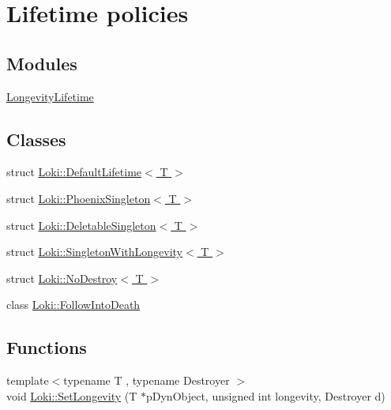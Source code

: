 \hypertarget{group__LifetimeGroup}{}\section{Lifetime policies}
\label{group__LifetimeGroup}
\subsection*{Modules}
\begin{DoxyCompactItemize}
\item 
\hyperlink{group__LongevityLifetimeGroup}{Longevity\+Lifetime}
\end{DoxyCompactItemize}
\subsection*{Classes}
\begin{DoxyCompactItemize}
\item 
struct \hyperlink{structLoki_1_1DefaultLifetime}{Loki\+::\+Default\+Lifetime$<$ T $>$}
\item 
struct \hyperlink{classLoki_1_1PhoenixSingleton}{Loki\+::\+Phoenix\+Singleton$<$ T $>$}
\item 
struct \hyperlink{classLoki_1_1DeletableSingleton}{Loki\+::\+Deletable\+Singleton$<$ T $>$}
\item 
struct \hyperlink{classLoki_1_1SingletonWithLongevity}{Loki\+::\+Singleton\+With\+Longevity$<$ T $>$}
\item 
struct \hyperlink{structLoki_1_1NoDestroy}{Loki\+::\+No\+Destroy$<$ T $>$}
\item 
class \hyperlink{classLoki_1_1FollowIntoDeath}{Loki\+::\+Follow\+Into\+Death}
\end{DoxyCompactItemize}
\subsection*{Functions}
\begin{DoxyCompactItemize}
\item 
{\footnotesize template$<$typename T , typename Destroyer $>$ }\\void \hyperlink{group__LifetimeGroup_ga3d62eacf2db507af877988f5a2ed34d7}{Loki\+::\+Set\+Longevity} (T $\ast$p\+Dyn\+Object, unsigned int longevity, Destroyer d)
\end{DoxyCompactItemize}


